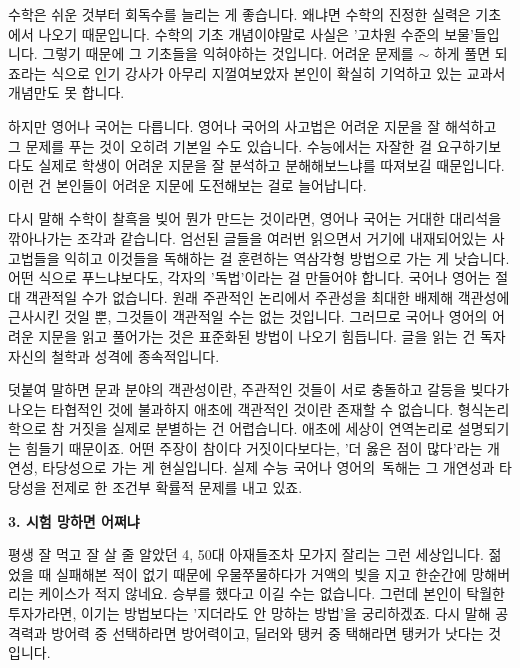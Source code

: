 수학은 쉬운 것부터 회독수를 늘리는 게 좋습니다. 왜냐면 수학의 진정한 실력은 기초에서 나오기 때문입니다.
수학의 기초 개념이야말로 사실은 '고차원 수준의 보물'들입니다. 그렇기 때문에 그 기초들을 익혀야하는 것입니다.
어려운 문제를 $\sim$ 하게 풀면 되죠라는 식으로 인기 강사가 아무리 지껄여보았자 본인이 확실히 기억하고 있는 교과서 개념만도 못 합니다.
\vspace{5mm}

하지만 영어나 국어는 다릅니다. 영어나 국어의 사고법은 어려운 지문을 잘 해석하고 그 문제를 푸는 것이 오히려 기본일 수도 있습니다.
수능에서는 자잘한 걸 요구하기보다도 실제로 학생이 어려운 지문을 잘 분석하고 분해해보느냐를 따져보길 때문입니다.
이런 건 본인들이 어려운 지문에 도전해보는 걸로 늘어납니다.
\vspace{5mm}

다시 말해 수학이 찰흑을 빚어 뭔가 만드는 것이라면, 영어나 국어는 거대한 대리석을 깎아나가는 조각과 같습니다.
엄선된 글들을 여러번 읽으면서 거기에 내재되어있는 사고법들을 익히고 이것들을 독해하는 걸 훈련하는 역삼각형 방법으로 가는 게 낫습니다.
어떤 식으로 푸느냐보다도, 각자의 '독법'이라는 걸 만들어야 합니다.
국어나 영어는 절대 객관적일 수가 없습니다. 원래 주관적인 논리에서 주관성을 최대한 배제해 객관성에 근사시킨 것일 뿐,
그것들이 객관적일 수는 없는 것입니다. 그러므로 국어나 영어의 어려운 지문을 읽고 풀어가는 것은 표준화된 방법이 나오기 힘듭니다.
글을 읽는 건 독자 자신의 철학과 성격에 종속적입니다.
\vspace{5mm}

덧붙여 말하면 문과 분야의 객관성이란, 주관적인 것들이 서로 충돌하고 갈등을 빚다가 나오는 타협적인 것에 불과하지
애초에 객관적인 것이란 존재할 수 없습니다.
형식논리학으로 참 거짓을 실제로 분별하는 건 어렵습니다. 애초에 세상이 연역논리로 설명되기는 힘들기 때문이죠.
어떤 주장이 참이다 거짓이다보다는, '더 옳은 점이 많다'라는 개연성, 타당성으로 가는 게 현실입니다.
실제 수능 국어나 영어의 독해는 그 개연성과 타당성을 전제로 한 조건부 확률적 문제를 내고 있죠.
\vspace{5mm}

\item \textbf{3. 시험 망하면 어쩌냐}
\vspace{5mm}

평생 잘 먹고 잘 살 줄 알았던 4, 50대 아재들조차 모가지 잘리는 그런 세상입니다.
젊었을 때 실패해본 적이 없기 때문에 우물쭈물하다가 거액의 빚을 지고 한순간에 망해버리는 케이스가 적지 않네요.
승부를 했다고 이길 수는 없습니다. 그런데 본인이 탁월한 투자가라면, 이기는 방법보다는 '지더라도 안 망하는 방법'을 궁리하겠죠.
다시 말해 공격력과 방어력 중 선택하라면 방어력이고, 딜러와 탱커 중 택해라면 탱커가 낫다는 것입니다.
\vspace{5mm}

